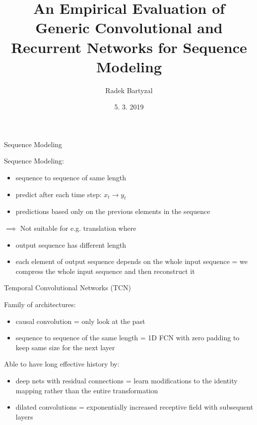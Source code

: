 \documentclass{beamer}
\begin{document}
\title{An Empirical Evaluation of Generic Convolutional and Recurrent Networks for Sequence Modeling}  
\author{Radek Bartyzal}
\date{5. 3. 2019} 

\frame{\titlepage} 

\begin{frame}{Sequence Modeling}

Sequence Modeling:
\begin{itemize}
\item  sequence to sequence of same length
\item predict after each time step: $x_t \rightarrow y_t$
\item predictions based only on the previous elements in the sequence
\end{itemize}

\vfill

$\implies$ Not suitable for e.g. translation where 
\begin{itemize}
\item output sequence has different length
\item each element of output sequence depends on the whole input sequence = we compress the whole input sequence and then reconstruct it 
\end{itemize}

\end{frame}

\begin{frame}{Temporal Convolutional Networks (TCN)}

Family of architectures:
\begin{itemize}
\item causal convolution = only look at the past
\item sequence to sequence of the same length = 1D FCN with zero padding to keep same size for the next layer
\end{itemize}

\vfill

Able to have long effective history by:
\begin{itemize}
\item deep nets with residual connections = learn modifications to the identity mapping rather than the entire transformation
\item dilated convolutions = exponentially increased receptive field with subsequent layers
\end{itemize}


\end{frame}
\end{document}
